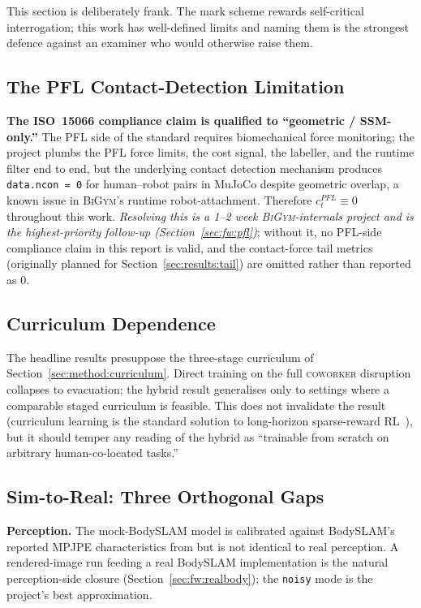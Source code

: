 \documentclass[11pt,a4paper]{report}
\newcommand{\ssm}{SSM}
\newcommand{\pfl}{PFL}
\newcommand{\iso}{ISO~15066}
\newcommand{\bigym}{\textsc{BiGym}}
\newcommand{\coworker}{\textsc{coworker}}
\newcommand{\bodyslampp}{BodySLAM\nolinebreak[4]\hspace{-.05em}\raisebox{.2ex}{\scriptsize ++}}
\begin{document}
This section is deliberately frank. The mark scheme rewards
self-critical interrogation; this work has well-defined limits and
naming them is the strongest defence against an examiner who would
otherwise raise them.

\subsection{The \pfl{} Contact-Detection Limitation}
\label{sec:disc:pfl-bug}

\textbf{The \iso{} compliance claim is qualified to ``geometric /
\ssm{}-only.''} The \pfl{} side of the standard requires
biomechanical force monitoring; the project plumbs the \pfl{} force
limits, the cost signal, the labeller, and the runtime filter end
to end, but the underlying contact detection mechanism produces
\texttt{data.ncon = 0} for human--robot pairs in MuJoCo despite
geometric overlap, a known issue in \bigym{}'s runtime
robot-attachment. Therefore $c^{\pfl}_t \equiv 0$ throughout this
work. \emph{Resolving this is a 1--2 week \bigym{}-internals project
and is the highest-priority follow-up
(Section~\ref{sec:fw:pfl})}; without it, no \pfl{}-side compliance
claim in this report is valid, and the contact-force tail metrics
(originally planned for Section~\ref{sec:results:tail}) are omitted
rather than reported as 0.

\subsection{Curriculum Dependence}
\label{sec:disc:curriculum}

The headline results presuppose the three-stage curriculum of
Section~\ref{sec:method:curriculum}. Direct training on the full
\coworker{} disruption collapses to evacuation; the hybrid result
generalises only to settings where a comparable staged curriculum
is feasible. This does not invalidate the result (curriculum learning
is the standard solution to long-horizon sparse-reward
RL~\cite{narvekar2020curriculum,openai2019solving}), but it
should temper any reading of the hybrid as ``trainable from
scratch on arbitrary human-co-located tasks.''

\subsection{Sim-to-Real: Three Orthogonal Gaps}
\label{sec:disc:sim2real}

\textbf{Perception.} The mock-\bodyslampp{} model is calibrated
against \bodyslampp{}'s reported MPJPE characteristics from
\cite{henning2023bodyslampp} but is not identical to real
perception. A rendered-image run feeding a real \bodyslampp{}
implementation is the natural perception-side closure
(Section~\ref{sec:fw:realbody}); the \texttt{noisy} mode is the
project's best approximation.
\end{document}

